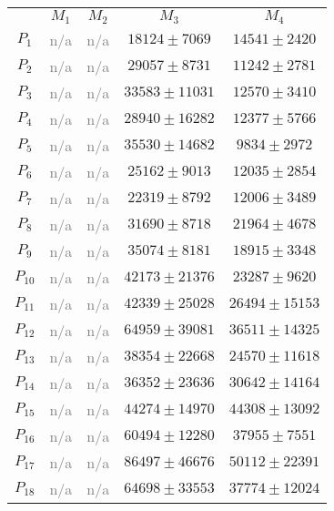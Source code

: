 \documentclass[anon]{CI}
\begin{document}
\begin{table}[H]
\begin{tabular}{ccccc}
				& $M_{1}$  & $M_{2}$  & $M_{3}$  & $M_{4}$ \\ \cline{2-5}
				$P_{1}$  & \textcolor{gray}{n/a}  & \textcolor{gray}{n/a}  & $18124\pm7069$  & $14541\pm2420$ \\
				$P_{2}$  & \textcolor{gray}{n/a}  & \textcolor{gray}{n/a}  & $29057\pm8731$  & $11242\pm2781$ \\
				$P_{3}$  & \textcolor{gray}{n/a}  & \textcolor{gray}{n/a}  & $33583\pm11031$  & $12570\pm3410$ \\
				$P_{4}$  & \textcolor{gray}{n/a}  & \textcolor{gray}{n/a}  & $28940\pm16282$  & $12377\pm5766$ \\
				$P_{5}$  & \textcolor{gray}{n/a}  & \textcolor{gray}{n/a}  & $35530\pm14682$  & $9834\pm2972$ \\
				$P_{6}$  & \textcolor{gray}{n/a}  & \textcolor{gray}{n/a}  & $25162\pm9013$  & $12035\pm2854$ \\
				$P_{7}$  & \textcolor{gray}{n/a}  & \textcolor{gray}{n/a}  & $22319\pm8792$  & $12006\pm3489$ \\
				$P_{8}$  & \textcolor{gray}{n/a}  & \textcolor{gray}{n/a}  & $31690\pm8718$  & $21964\pm4678$ \\
				$P_{9}$  & \textcolor{gray}{n/a}  & \textcolor{gray}{n/a}  & $35074\pm8181$  & $18915\pm3348$ \\
				$P_{10}$  & \textcolor{gray}{n/a}  & \textcolor{gray}{n/a}  & $42173\pm21376$  & $23287\pm9620$ \\
				$P_{11}$  & \textcolor{gray}{n/a}  & \textcolor{gray}{n/a}  & $42339\pm25028$  & $26494\pm15153$ \\
				$P_{12}$  & \textcolor{gray}{n/a}  & \textcolor{gray}{n/a}  & $64959\pm39081$  & $36511\pm14325$ \\
				$P_{13}$  & \textcolor{gray}{n/a}  & \textcolor{gray}{n/a}  & $38354\pm22668$  & $24570\pm11618$ \\
				$P_{14}$  & \textcolor{gray}{n/a}  & \textcolor{gray}{n/a}  & $36352\pm23636$  & $30642\pm14164$ \\
				$P_{15}$  & \textcolor{gray}{n/a}  & \textcolor{gray}{n/a}  & $44274\pm14970$  & $44308\pm13092$ \\
				$P_{16}$  & \textcolor{gray}{n/a}  & \textcolor{gray}{n/a}  & $60494\pm12280$  & $37955\pm7551$ \\
				$P_{17}$  & \textcolor{gray}{n/a}  & \textcolor{gray}{n/a}  & $86497\pm46676$  & $50112\pm22391$ \\
				$P_{18}$  & \textcolor{gray}{n/a}  & \textcolor{gray}{n/a}  & $64698\pm33553$  & $37774\pm12024$ \\

\end{tabular}
\end{table}
\end{document}
